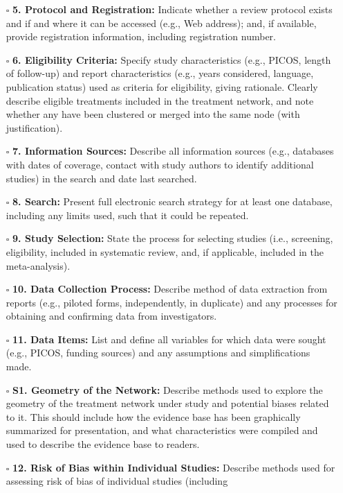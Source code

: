 \documentclass[11pt]{article}
\def\tightlist{}
\begin{document}
\begin{Form}
\begin{itemize}
\tightlist
\item[$\square$]
  \textbf{5. Protocol and Registration:} Indicate whether a review
  protocol exists and if and where it can be accessed (e.g., Web
  address); and, if available, provide registration information,
  including registration number.
\item[$\square$]
  \textbf{6. Eligibility Criteria:} Specify study characteristics (e.g.,
  PICOS, length of follow-up) and report characteristics (e.g., years
  considered, language, publication status) used as criteria for
  eligibility, giving rationale. Clearly describe eligible treatments
  included in the treatment network, and note whether any have been
  clustered or merged into the same node (with justification).
\item[$\square$]
  \textbf{7. Information Sources:} Describe all information sources
  (e.g., databases with dates of coverage, contact with study authors to
  identify additional studies) in the search and date last searched.
\item[$\square$]
  \textbf{8. Search:} Present full electronic search strategy for at
  least one database, including any limits used, such that it could be
  repeated.
\item[$\square$]
  \textbf{9. Study Selection:} State the process for selecting studies
  (i.e., screening, eligibility, included in systematic review, and, if
  applicable, included in the meta-analysis).
\item[$\square$]
  \textbf{10. Data Collection Process:} Describe method of data
  extraction from reports (e.g., piloted forms, independently, in
  duplicate) and any processes for obtaining and confirming data from
  investigators.
\item[$\square$]
  \textbf{11. Data Items:} List and define all variables for which data
  were sought (e.g., PICOS, funding sources) and any assumptions and
  simplifications made.
\item[$\square$]
  \textbf{S1. Geometry of the Network:} Describe methods used to explore
  the geometry of the treatment network under study and potential biases
  related to it. This should include how the evidence base has been
  graphically summarized for presentation, and what characteristics were
  compiled and used to describe the evidence base to readers.
\item[$\square$]
  \textbf{12. Risk of Bias within Individual Studies:} Describe methods
  used for assessing risk of bias of individual studies (including

\end{itemize}
\end{Form}
\end{document}
